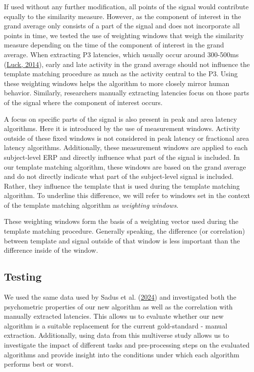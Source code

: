 \documentclass[
  man]{apa7}
\begin{document}
If used without any further modification, all points of the signal would contribute equally to the similarity measure. However, as the component of interest in the grand average only consists of a part of the signal and does not incorporate all points in time, we tested the use of weighting windows that weigh the similarity measure depending on the time of the component of interest in the grand average. When extracting P3 latencies, which usually occur around 300-500ms (\protect\hyperlink{ref-luck2014introduction}{Luck, 2014}), early and late activity in the grand average should not influence the template matching procedure as much as the activity central to the P3. Using these weighting windows helps the algorithm to more closely mirror human behavior. Similarly, researchers manually extracting latencies focus on those parts of the signal where the component of interest occurs.

A focus on specific parts of the signal is also present in peak and area latency algorithms. Here it is introduced by the use of measurement windows. Activity outside of these fixed windows is not considered in peak latency or fractional area latency algorithms. Additionally, these measurement windows are applied to each subject-level ERP and directly influence what part of the signal is included. In our template matching algorithm, these windows are based on the grand average and do not directly indicate what part of the subject-level signal is included. Rather, they influence the template that is used during the template matching algorithm. To underline this difference, we will refer to windows set in the context of the template matching algorithm as \emph{weighting windows}.

These weighting windows form the basis of a weighting vector used during the template matching procedure. Generally speaking, the difference (or correlation) between template and signal outside of that window is less important than the difference inside of the window.

\hypertarget{testing}{%
\subsection{Testing}\label{testing}}

We used the same data used by Sadus et al. (\protect\hyperlink{ref-sadus2024explorative}{2024}) and investigated both the psychometric properties of our new algorithm as well as the correlation with manually extracted latencies. This allows us to evaluate whether our new algorithm is a suitable replacement for the current gold-standard - manual extraction. Additionally, using data from this multiverse study allows us to investigate the impact of different tasks and pre-processing steps on the evaluated algorithms and provide insight into the conditions under which each algorithm performs best or worst.
\end{document}
